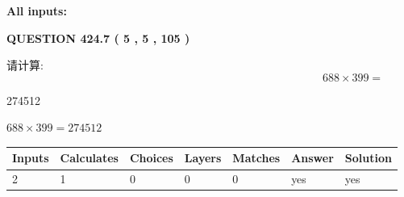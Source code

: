 \documentclass{ctexart}
\begin{document}
   
   
   
\noindent{}
   
   
   
   
\noindent\vspace{0.1in}\hspace{-0.08in} {\textbf{\Large{All inputs: }}}
   
   
  
\vspace{0.2in}
  
{\textbf{\Large{QUESTION
424.7 
 ( 5 , 5 , 105 )
}}}
  
  
 
请计算:
\begin{equation}
688  \times    %
399 = \nonumber
\end{equation}
 
 
 
\noindent{}
 
 

274512
 
 
\noindent{}
 
 

 
 
 
\noindent{}
 
 

$ %
688 \times  %
399=   %
274512$
 
 
\noindent{}
 
 

 
   
   
   
   
\noindent\begin{tabular}{|l|l|l|l|l|l|l|}
 \hline
Inputs & Calculates & Choices & Layers & Matches & Answer & Solution \\ \hline
 2  & 
 1  & 
 0
  & 
 0  & 
 0  & 
  yes & 
  yes 
  \\ \hline
 \end{tabular}
   
   
   
   
\noindent{}
   
\end{document}
